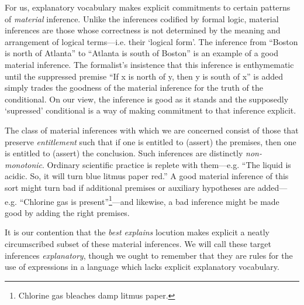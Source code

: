 \documentclass{svjour3}                     %
\begin{document}
For us, explanatory vocabulary makes explicit commitments to certain patterns of \textit{material} inference. Unlike the inferences codified by formal logic, material inferences are those whose correctness is not determined by the meaning and arrangement of logical terms---i.e. their `logical form'. The inference from ``Boston is north of Atlanta'' to ``Atlanta is south of Boston'' is an example of a good material inference. The formalist's insistence that this inference is enthymematic until the suppressed premise ``If x is north of y, then y is south of x'' is added simply trades the goodness of the material inference for the truth of the conditional. On our view, the inference is good as it stands and the supposedly `supressed' conditional is a way of making commitment to that inference explicit. 

The class of material inferences with which we are concerned consist of those that preserve \textit{entitlement} such that if one is entitled to (assert) the premises, then one is entitled to (assert) the conclusion. Such inferences are distinctly \textit{non-monotonic}. Ordinary scientific practice is replete with them---e.g. ``The liquid is acidic. So, it will turn blue litmus paper red.'' A good material inference of this sort might turn bad if additional premises or auxiliary hypotheses are added---e.g. ``Chlorine gas is present''\footnote{Chlorine gas bleaches damp litmus paper.}---and likewise, a bad inference might be made good by adding the right premises. 

It is our contention that the \textit{best explains} locution makes explicit a neatly circumscribed subset of these material inferences. We will call these target inferences \textit{explanatory}, though we ought to remember that they are rules for the use of expressions in a language which lacks explicit explanatory vocabulary. 
\end{document}
